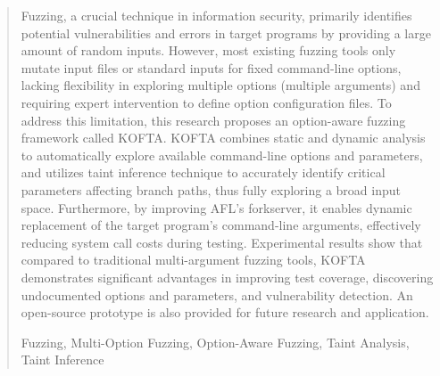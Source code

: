 \begin{abstract}
\iffalse

模糊測試（fuzzing）作為資訊安全領域的重要技術，主要透過提供大量隨機輸入，以找出目標程式中的潛在漏洞與錯誤。然而，現有的模糊測試工具多數只針對固定的命令列選項進行輸入檔或標準輸入的變異，對於多選項（多參數）的探索缺乏靈活性且需要專家介入定義參數組態檔。為解決這一限制，本研究提出了一個名為 KOFTA 的選項感知模糊測試架構。KOFTA 結合靜態分析與動態分析自動化地探索可用的命令列選項與選項參數，並利用污染源推論技術精確找出影響分支路徑的關鍵參數，以充分探索廣闊的輸入空間。此外，透過改良 AFL 的 forkserver，使其能夠動態更換目標程式的命令列參數，有效降低測試過程中的系統呼叫成本。實驗結果顯示，相較於傳統的多參數模糊測試工具，KOFTA 在提升測試覆蓋率、發掘未知選項與參數，以及漏洞挖掘方面展現了明顯的優勢，並提供了一個開源的原型以供未來研究與應用。
\else

Fuzzing, a crucial technique in information security, primarily identifies potential vulnerabilities and errors in target programs by providing a large amount of random inputs. However, most existing fuzzing tools only mutate input files or standard inputs for fixed command-line options, lacking flexibility in exploring multiple options (multiple arguments) and requiring expert intervention to define option configuration files. To address this limitation, this research proposes an option-aware fuzzing framework called KOFTA. KOFTA combines static and dynamic analysis to automatically explore available command-line options and parameters, and utilizes taint inference technique to accurately identify critical parameters affecting branch paths, thus fully exploring a broad input space. Furthermore, by improving AFL's forkserver, it enables dynamic replacement of the target program's command-line arguments, effectively reducing system call costs during testing. Experimental results show that compared to traditional multi-argument fuzzing tools, KOFTA demonstrates significant advantages in improving test coverage, discovering undocumented options and parameters, and vulnerability detection. An open-source prototype is also provided for future research and application.

\fi
  \begin{keywords}
  Fuzzing, Multi-Option Fuzzing, Option-Aware Fuzzing, Taint Analysis, Taint Inference
  \end{keywords}
\end{abstract}